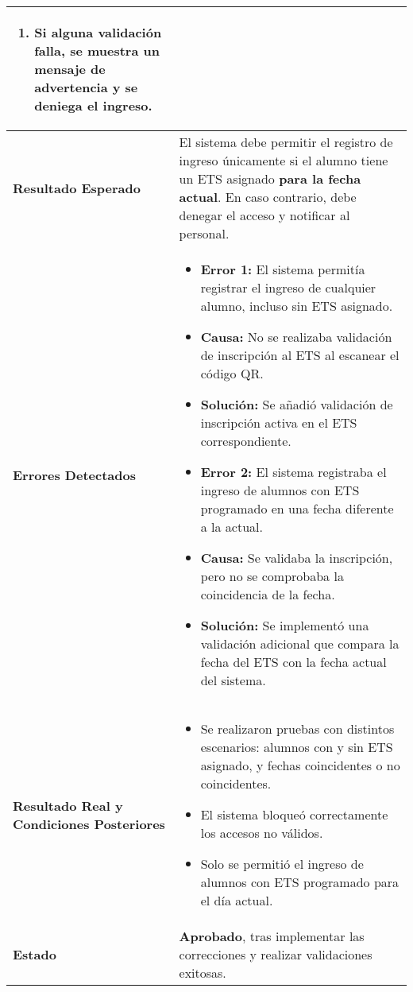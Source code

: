 \begin{longtable}{|p{5cm}|p{10cm}|}
\begin{enumerate}
		\item Si alguna validación falla, se muestra un mensaje de advertencia y se deniega el ingreso.
	\end{enumerate} \\
	\hline \textbf{Resultado Esperado} &
	El sistema debe permitir el registro de ingreso únicamente si el alumno tiene un ETS asignado \textbf{para la fecha actual}. En caso contrario, debe denegar el acceso y notificar al personal. \\
	\hline \textbf{Errores Detectados} &
	\begin{itemize}
		\item \textbf{Error 1:} El sistema permitía registrar el ingreso de cualquier alumno, incluso sin ETS asignado.
		\item \textbf{Causa:} No se realizaba validación de inscripción al ETS al escanear el código QR.
		\item \textbf{Solución:} Se añadió validación de inscripción activa en el ETS correspondiente.
		\item \textbf{Error 2:} El sistema registraba el ingreso de alumnos con ETS programado en una fecha diferente a la actual.
		\item \textbf{Causa:} Se validaba la inscripción, pero no se comprobaba la coincidencia de la fecha.
		\item \textbf{Solución:} Se implementó una validación adicional que compara la fecha del ETS con la fecha actual del sistema.
	\end{itemize} \\
	\hline \textbf{Resultado Real y Condiciones Posteriores} &
	\begin{itemize}
		\item Se realizaron pruebas con distintos escenarios: alumnos con y sin ETS asignado, y fechas coincidentes o no coincidentes.
		\item El sistema bloqueó correctamente los accesos no válidos.
		\item Solo se permitió el ingreso de alumnos con ETS programado para el día actual.
	\end{itemize} \\
	\hline \textbf{Estado} & \textbf{Aprobado}, tras implementar las correcciones y realizar validaciones exitosas. \\
	\hline
\end{longtable}

